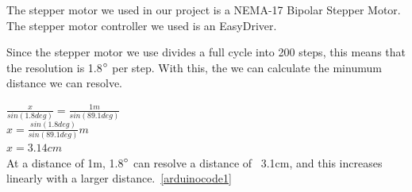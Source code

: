 The stepper motor we used in our project is a NEMA-17 Bipolar Stepper Motor. \cite{steppermotor}
The stepper motor controller we used is an EasyDriver.\cite{steppercontroller}



Since the stepper motor we use divides a full cycle into 200 steps, this means that the resolution is 1.8$\degree$ per step. With this, the we can calculate the minumum distance we can resolve.

$\frac{x}{sin(1.8deg)} = \frac{1m}{sin(89.1deg)}$ \\
$x = \frac{sin(1.8deg)}{sin(89.1deg)}m$ \\
$x = 3.14cm$ \\

At a distance of 1m, 1.8$\degree$ can resolve a distance of ~3.1cm, and this increases linearly with a larger distance.~\ref{arduinocode1}

